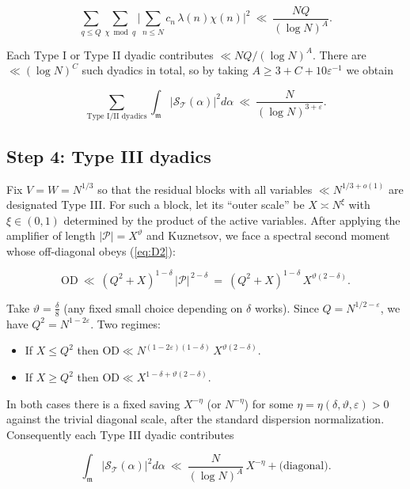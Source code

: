 \documentclass[11pt]{article}
\def\eqref#1{(\ref{#1})}%
\theoremstyle{definition}
\theoremstyle{remark}
\numberwithin{equation}{part}
\begin{document}
$$
	\sum_{q\le Q}\sum_{\chi\bmod q}
	\Big|\sum_{n\le N} c_n\,\lambda(n)\chi(n)\Big|^2
	\ \ll\ \frac{NQ}{(\log N)^A}.
$$

Each Type I or Type II dyadic contributes $\ll NQ/(\log N)^A$. There are $\ll(\log N)^C$ such dyadics in total, so by taking $A\ge 3+C+10\varepsilon^{-1}$ we obtain

\begin{equation}\label{eq:D5}
	\sum_{\text{Type I/II dyadics}}
	\int_{\mathfrak m}\big|\mathcal S_{\mathcal T}(\alpha)\big|^2 d\alpha
	\ \ll\ \frac{N}{(\log N)^{3+\varepsilon}}.
\end{equation}

\subsection{Step 4: Type III dyadics}
Fix $V=W=N^{1/3}$ so that the residual blocks with all variables $\ll N^{1/3+o(1)}$ are designated Type III. For such a block, let its “outer scale” be $X\asymp N^\xi$ with $\xi\in(0,1)$ determined by the product of the active variables. After applying the amplifier of length $|\mathcal P|=X^\vartheta$ and Kuznetsov, we face a spectral second moment whose off-diagonal obeys \eqref{eq:D2}:

$$
	\mathrm{OD}\ \ll\ (Q^2+X)^{1-\delta}\,|\mathcal P|^{\,2-\delta}
	\ =\ (Q^2+X)^{1-\delta}\,X^{\vartheta(2-\delta)}.
$$

Take $\vartheta=\tfrac{\delta}{8}$ (any fixed small choice depending on $\delta$ works). Since $Q=N^{1/2-\varepsilon}$, we have $Q^2=N^{1-2\varepsilon}$. Two regimes:

\begin{itemize}
	\item If $X\le Q^2$ then $\mathrm{OD}\ll N^{(1-2\varepsilon)(1-\delta)}\,X^{\vartheta(2-\delta)}$.
	\item If $X\ge Q^2$ then $\mathrm{OD}\ll X^{1-\delta+\vartheta(2-\delta)}$.
\end{itemize}

In both cases there is a fixed saving $X^{-\eta}$ (or $N^{-\eta}$) for some $\eta=\eta(\delta,\vartheta,\varepsilon)>0$ against the trivial diagonal scale, after the standard dispersion normalization. Consequently each Type III dyadic contributes

\begin{equation}\label{eq:D6}\int_{\mathfrak m}\big|\mathcal S_{\mathcal T}(\alpha)\big|^2 d\alpha\ \ll\ \frac{N}{(\log N)^{A}}\,X^{-\eta}+\text{(diagonal)}.\end{equation}
\end{document}
